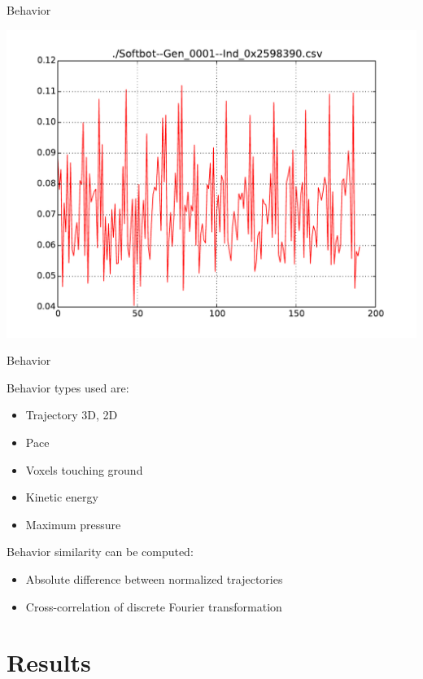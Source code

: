\documentclass{beamer}
\begin{document}
\begin{frame}{Behavior}
\begin{center}
\includegraphics[height=0.15\textheight]{figures/behaviorPace.pdf}
\end{center}
\end{frame}


\begin{frame}{Behavior}
\begin{block}{Behavior types used are:}
\begin{itemize}
\item Trajectory 3D, 2D
\item Pace
\item Voxels touching ground
\item Kinetic energy
\item Maximum pressure
\end{itemize}
\end{block}
\begin{block}{Behavior similarity can be computed:}
\begin{itemize}
\item Absolute difference between normalized trajectories
\item Cross-correlation of discrete Fourier transformation
\end{itemize}
\end{block}
\end{frame}

\section{Results}
\end{document}
